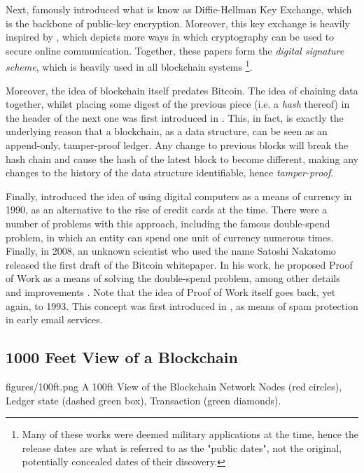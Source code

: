 Next, \cite{diffieNewDirectionsCryptography1976} famously introduced what is know as Diffie-Hellman
Key Exchange, which is the backbone of public-key encryption. Moreover, this key exchange is heavily
inspired by \cite{merkleSecureCommunicationsInsecure1978}, which depicts more ways in which
cryptography can be used to secure online communication. Together, these papers form the
\textit{digital signature scheme}, which is heavily used in all blockchain systems \footnote{Many of
these works were deemed military applications at the time, hence the release dates are what is
referred to as the "public dates", not the original, potentially concealed dates of their
discovery.}.

Moreover, the idea of blockchain itself predates Bitcoin. The idea of chaining data together, whilst
placing some digest of the previous piece (i.e. a \textit{hash} thereof) in the header of the next
one was first introduced in \cite{haberHowTimestampDigital1991}. This, in fact, is exactly the
underlying reason that a blockchain, as a data structure, can be seen as an append-only,
tamper-proof ledger. Any change to previous blocks will break the hash chain and cause the hash of
the latest block to become different, making any changes to the history of the data structure
identifiable, hence \textit{tamper-proof}.

Finally, \cite{chaumUntraceableElectronicCash1990} introduced the idea of using digital computers as
a means of currency in 1990, as an alternative to the rise of credit cards at the time. There were a
number of problems with this approach, including the famous double-spend problem, in which an entity
can spend one unit of currency numerous times. Finally, in 2008, an unknown scientist who used the
name Satoshi Nakatomo released the first draft of the Bitcoin whitepaper. In his work, he proposed
Proof of Work as a means of solving the double-spend problem, among other details and improvements
\cite{nakamotoBitcoinPeertoPeerElectronic}. Note that the idea of Proof of Work itself goes back,
yet again, to 1993. This concept was first introduced in
\cite{dworkPricingProcessingCombatting1993}, as means of spam protection in early email services.

\subsection{1000 Feet View of a Blockchain} \label{chap_bg:subsec:100ft}

\figuremacro
	{figures/100ft.png} {A 100ft View of the Blockchain Network} {Nodes (red circles), Ledger state
	(dashed green box), Transaction (green diamonds).}

